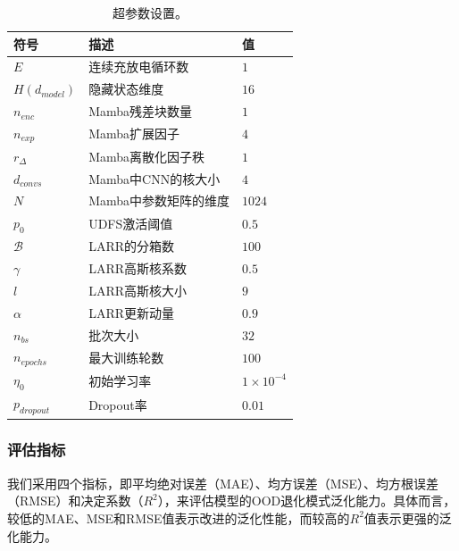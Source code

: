 \documentclass[UTF8,lettersize,journal]{IEEEtran}
\begin{document}
\begin{table}[htbp]
\centering
\caption{超参数设置。}
\scalebox{0.8}
{
    \small
\begin{threeparttable}
    \begin{tabular}{rll}
    \toprule
    \multicolumn{1}{l}{符号} & 描述 & 值 \\
    \midrule
    \multicolumn{1}{l}{$E$} & 连续充放电循环数 & $1$ \\
    \multicolumn{1}{l}{$H (d_{model})$} & 隐藏状态维度 & $16$ \\
    \multicolumn{1}{l}{$n_{enc}$} & Mamba残差块数量 & $1$ \\
    \multicolumn{1}{l}{$n_{exp}$} & Mamba扩展因子 & $4$ \\
    \multicolumn{1}{l}{$r_{\Delta}$} & Mamba离散化因子秩 & $1$ \\
    \multicolumn{1}{l}{$d_{convs}$} & Mamba中CNN的核大小 & $4$ \\
    \multicolumn{1}{l}{$N$} & Mamba中参数矩阵的维度 & $1024$ \\
    \multicolumn{1}{l}{$p_{0}$} & UDFS激活阈值 & $0.5$ \\
    \multicolumn{1}{l}{$\mathcal{B}$} & LARR的分箱数 & $100$ \\
    \multicolumn{1}{l}{$\gamma$} & LARR高斯核系数 & $0.5$ \\
    \multicolumn{1}{l}{$l$} & LARR高斯核大小 & $9$ \\
    \multicolumn{1}{l}{$\alpha$} & LARR更新动量 & $0.9$ \\
    \multicolumn{1}{l}{$n_{bs}$} & 批次大小 & $32$ \\
    \multicolumn{1}{l}{$n_{epochs}$} & 最大训练轮数 & $100$ \\
    \multicolumn{1}{l}{$\eta_{0}$} & 初始学习率 & $1 \times 10^{-4}$ \\
    \multicolumn{1}{l}{$p_{dropout}$} & Dropout率 & $0.01$ \\
    \bottomrule
    \end{tabular}%
\end{threeparttable}
}
\label{tab:hyperparameters_setting}%
\end{table}%

\subsubsection{评估指标}

我们采用四个指标，即平均绝对误差（MAE）、均方误差（MSE）、均方根误差（RMSE）和决定系数（$R^{2}$），来评估模型的OOD退化模式泛化能力。具体而言，较低的MAE、MSE和RMSE值表示改进的泛化性能，而较高的$R^{2}$值表示更强的泛化能力。
\end{document}

